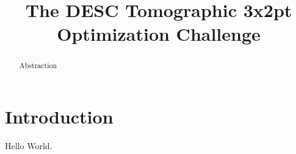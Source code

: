 \documentclass[modern]{lsstdescnote}
\begin{document}


\title{The DESC Tomographic 3x2pt Optimization Challenge}



\begin{abstract}
  Abstraction
\end{abstract}

\maketitle

\section{Introduction}
Hello World.
\end{document}
